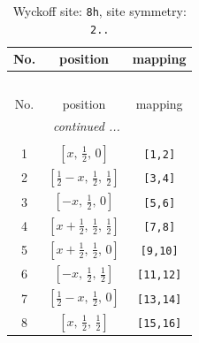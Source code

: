 \documentclass[fleqn,8pt]{jsarticle}
\begin{document}
\begin{longtable}{ccc}
\caption{Wyckoff site: {\tt 8h}, site symmetry: {\tt 2..}}
 \\
 \hline \hline
No. & position & mapping \\ \hline \endfirsthead

\multicolumn{2}{l}{\tablename\ \thetable{}} \\
 \hline \hline
No. & position & mapping \\ \hline \endhead

 \hline \hline
\multicolumn{2}{r}{\footnotesize\it continued ...} \\ \endfoot

 \hline \hline
\multicolumn{2}{r}{} \\ \endlastfoot

1 & $\left[ x,\, \frac{1}{2},\, 0 \right]$ & {\tt [1,2]} \\ \hline
2 & $\left[ \frac{1}{2} - x,\, \frac{1}{2},\, \frac{1}{2} \right]$ & {\tt [3,4]} \\ \hline
3 & $\left[ - x,\, \frac{1}{2},\, 0 \right]$ & {\tt [5,6]} \\ \hline
4 & $\left[ x + \frac{1}{2},\, \frac{1}{2},\, \frac{1}{2} \right]$ & {\tt [7,8]} \\ \hline
5 & $\left[ x + \frac{1}{2},\, \frac{1}{2},\, 0 \right]$ & {\tt [9,10]} \\ \hline
6 & $\left[ - x,\, \frac{1}{2},\, \frac{1}{2} \right]$ & {\tt [11,12]} \\ \hline
7 & $\left[ \frac{1}{2} - x,\, \frac{1}{2},\, 0 \right]$ & {\tt [13,14]} \\ \hline
8 & $\left[ x,\, \frac{1}{2},\, \frac{1}{2} \right]$ & {\tt [15,16]} \\
\end{longtable}
\renewcommand{\arraystretch}{1.2}
\end{document}
